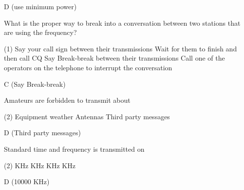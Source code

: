 \documentclass[a4paper]{article}
\begin{document}
\begin{solution}
	D (use minimum power)
\end{solution}

\vspace{5mm}



\begin{question}What is the proper way to break into a conversation between two stations that are using the frequency?
	\begin{tasks}(1)
		\task Say your call sign between their transmissions
		\task Wait for them to finish and then call CQ
		\task Say \apostrophe{}Break-break\apostrophe{} between their transmissions
		\task Call one of the operators on the telephone to interrupt the conversation
	\end{tasks}
\end{question}

\begin{solution}
	C (Say \apostrophe{}Break-break\apostrophe{})
\end{solution}

\vspace{5mm}



\begin{question}Amateurs are forbidden to transmit about
	\begin{tasks}(2)
		\task Equipment
		\task weather
		\task Antennas
		\task Third party messages
	\end{tasks}
\end{question}

\begin{solution}
	D (Third party messages)
\end{solution}

\vspace{5mm}



\begin{question}Standard time and frequency is transmitted on
	\begin{tasks}(2)
		 KHz
		 KHz
		 KHz
		 KHz
	\end{tasks}
\end{question}

\begin{solution}
	D (10000 KHz)
\end{solution}

\vspace{5mm}
\end{document}
